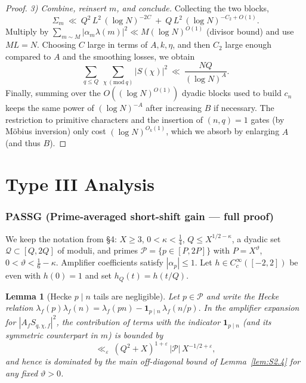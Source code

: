 \documentclass[11pt]{article}
\newtheorem{lemma}{Lemma}[part]
\theoremstyle{definition}
\theoremstyle{remark}
\numberwithin{equation}{part}
\begin{document}
\begin{proof}
	\smallskip
	\noindent\emph{3) Combine, reinsert $m$, and conclude.}
	Collecting the two blocks,
	\[
		\Sigma_m\ \ll\ Q^2\,L^2\,(\log N)^{-2C}\ +\ Q\,L^2\,(\log N)^{-C_2+O(1)}.
	\]
	Multiply by $\sum_{m\sim M} |\alpha_m\lambda(m)|^2\ll M(\log N)^{O(1)}$ (divisor bound) and use $ML=N$. Choosing $C$ large in terms of $A,k,\eta$, and then $C_2$ large enough compared to $A$ and the smoothing losses, we obtain
	\[
		\sum_{q\le Q}\ \sum_{\chi\ (\mathrm{mod}\ q)} |S(\chi)|^2
		\ \ll\ \frac{NQ}{(\log N)^{A}}.
	\]
	Finally, summing over the $O((\log N)^{O(1)})$ dyadic blocks used to build $c_n$ keeps the same power of $(\log N)^{-A}$ after increasing $B$ if necessary. The restriction to primitive characters and the insertion of $(n,q)=1$ gates (by Möbius inversion) only cost $(\log N)^{O_k(1)}$, which we absorb by enlarging $A$ (and thus $B$).
\end{proof}



\part{Type III Analysis}

\section{PASSG (Prime-averaged short-shift gain — full proof)}

We keep the notation from §4: $X\ge 3$, $0<\kappa<\tfrac14$, $Q\le X^{1/2-\kappa}$, a dyadic set $\mathcal Q\subset[Q,2Q]$ of moduli, and primes $\mathcal P=\{p\in[P,2P]\}$ with $P=X^\vartheta$, $0<\vartheta<\tfrac16-\kappa$. Amplifier coefficients satisfy $|\alpha_p|\le 1$. Let $h\in C_c^\infty([-2,2])$ be even with $h(0)=1$ and set $h_Q(t)=h(t/Q)$.

\begin{lemma}[Hecke $p\mid n$ tails are negligible]\label{lem:hecke-tails}
	Let $p\in\mathcal P$ and write the Hecke relation
	\(
	\lambda_f(p)\lambda_f(n)=\lambda_f(pn)-\mathbf 1_{p\mid n}\,\lambda_f(n/p).
	\)
	In the amplifier expansion for $|A_f S_{q,\chi,f}|^2$,
	the contribution of terms with the indicator $\mathbf 1_{p\mid n}$ (and its symmetric counterpart in $m$)
	is bounded by
	\[
		\ll_\varepsilon\ (Q^2+X)^{1+\varepsilon}\,|\mathcal P|\,X^{-1/2+\varepsilon},
	\]
	and hence is dominated by the main off-diagonal bound of Lemma~\ref{lem:S2.4} for any fixed $\vartheta>0$.
\end{lemma}
\end{document}
